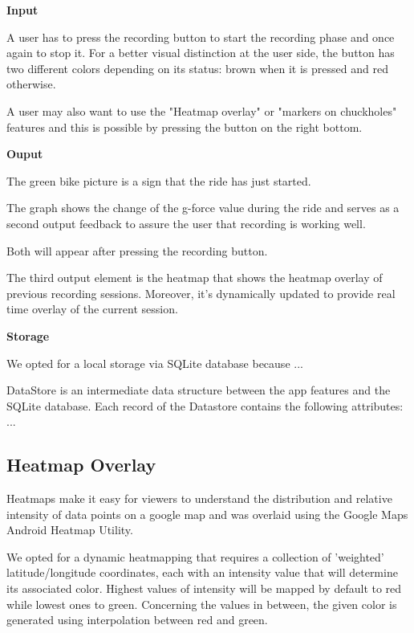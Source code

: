 \documentclass[10pt,a4paper]{article} %
\begin{document}
    \textbf{Input}
    
    A user has to press the recording button to start the recording phase and once again to stop it.
    For a better visual distinction at the user side, the button has two different colors depending on its status: brown when it is pressed and red otherwise.
    
    A user may also want to use the "Heatmap overlay" or "markers on chuckholes" features and this is possible by pressing the button on the right bottom.
    
    \textbf{Ouput}
    
    The green bike picture is a sign that the ride has just started.
    
    The graph shows the change of the g-force value during the ride and serves as a second output feedback to assure the user that recording is working well.
    
    Both will appear after pressing the recording button.
    
    The third output element is the heatmap that shows the heatmap overlay of previous recording sessions. Moreover, it's dynamically updated to provide real time overlay of the current session.
    
    
    \textbf{Storage}
    
    We opted for a local storage via SQLite database because ...
    
    DataStore is an intermediate data structure between the app features and the SQLite database. Each record of the Datastore contains the following attributes: ...
    
    
    
    
    
    
    
    \subsection{ Heatmap Overlay}
    
    Heatmaps make it easy for viewers to understand the distribution and relative intensity of data points on a google map and was overlaid using the Google Maps Android Heatmap Utility.
    
    We opted for a dynamic heatmapping that requires a collection of 'weighted' latitude/longitude coordinates, each with an intensity value that will determine its associated color.
    Highest values of intensity will be mapped by default to red while lowest ones to green. Concerning the values in between, the given color is generated using interpolation between red and green. 
    
\end{document}
